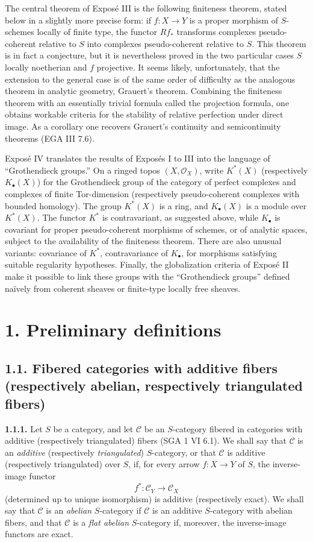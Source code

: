 \documentclass[11pt]{article}
\begin{document}
The central theorem of Exposé III is the following finiteness theorem, stated below in a slightly more precise form: if \(f:X\to Y\) is a proper morphism of \(S\)-schemes locally of finite type, the functor \(Rf_*\) transforms complexes pseudo-coherent relative to \(S\) into complexes pseudo-coherent relative to \(S\). This theorem is in fact a conjecture, but it is nevertheless proved in the two particular cases \(S\) locally noetherian and \(f\) projective. It seems likely, unfortunately, that the extension to the general case is of the same order of difficulty as the analogous theorem in analytic geometry, Grauert's theorem. Combining the finiteness theorem with an essentially trivial formula called the projection formula, one obtains workable criteria for the stability of relative perfection under direct image. As a corollary one recovers Grauert's continuity and semicontinuity theorems (EGA III 7.6).

Exposé IV translates the results of Exposés I to III into the language of ``Grothendieck groups.'' On a ringed topos \((X,\mathcal O_X)\), write \(K^*(X)\) (respectively \(K_\bullet(X)\)) for the Grothendieck group of the category of perfect complexes and complexes of finite Tor-dimension (respectively pseudo-coherent complexes with bounded homology). The group \(K^*(X)\) is a ring, and \(K_\bullet(X)\) is a module over \(K^*(X)\). The functor \(K^*\) is contravariant, as suggested above, while \(K_\bullet\) is covariant for proper pseudo-coherent morphisms of schemes, or of analytic spaces, subject to the availability of the finiteness theorem. There are also unusual variants: covariance of \(K^*\), contravariance of \(K_\bullet\), for morphisms satisfying suitable regularity hypotheses. Finally, the globalization criteria of Exposé II make it possible to link these groups with the ``Grothendieck groups'' defined naïvely from coherent sheaves or finite-type locally free sheaves.

\section*{1. Preliminary definitions}

\subsection*{1.1. Fibered categories with additive fibers (respectively abelian, respectively triangulated fibers)}

\textbf{1.1.1.} Let \(S\) be a category, and let \(\mathcal C\) be an \(S\)-category fibered in categories with additive (respectively triangulated) fibers (SGA 1 VI 6.1). We shall say that \(\mathcal C\) is an \emph{additive} (respectively \emph{triangulated}) \(S\)-category, or that \(\mathcal C\) is additive (respectively triangulated) over \(S\), if, for every arrow \(f:X\to Y\) of \(S\), the inverse-image functor
\[
  f^*:\mathcal C_Y\longrightarrow \mathcal C_X
\]
(determined up to unique isomorphism) is additive (respectively exact). We shall say that \(\mathcal C\) is an \emph{abelian} \(S\)-category if \(\mathcal C\) is an additive \(S\)-category with abelian fibers, and that \(\mathcal C\) is a \emph{flat abelian} \(S\)-category if, moreover, the inverse-image functors are exact.
\end{document}
